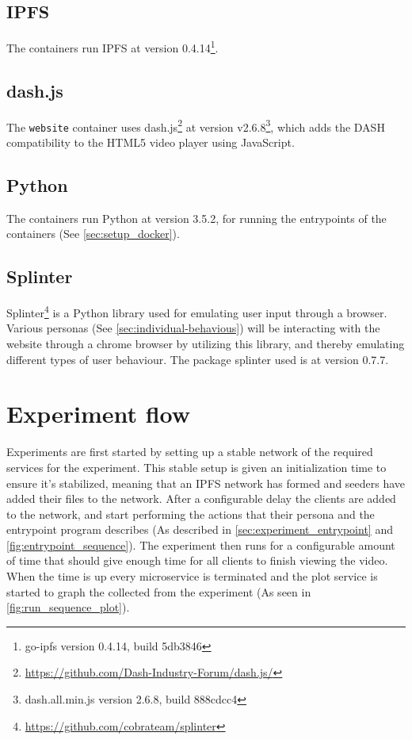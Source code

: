 \subsection{IPFS}
\label{sec:setup_ipfs}
The containers run \acs{IPFS} at version 0.4.14\footnote{go-ipfs version 0.4.14, build 5db3846}.


\subsection{dash.js}
\label{sec:setup_dash.js}
The \texttt{website} container uses dash.js\footnote{\url{https://github.com/Dash-Industry-Forum/dash.js/}} at version v2.6.8\footnote{dash.all.min.js version 2.6.8, build 888cdcc4}, which adds the \ac{DASH} compatibility to the \acs{HTML}5 video player using JavaScript.


\subsection{Python}
\label{sec:setup_python}
The containers run Python at version 3.5.2, for running the entrypoints of the containers (See \autoref{sec:setup_docker}).


\subsection{Splinter}
\label{sec:setup_splinter}
Splinter\footnote{\url{https://github.com/cobrateam/splinter}} is a Python library used for emulating user input through a browser. Various personas (See \autoref{sec:individual-behavious}) will be interacting with the website through a chrome browser by utilizing this library, and thereby emulating different types of user behaviour.
The package splinter used is at version 0.7.7.



\section{Experiment flow}
Experiments are first started by setting up a stable network of the required services for the experiment. This stable setup is given an initialization time to ensure it's stabilized, meaning that an IPFS network has formed and seeders have added their files to the network.
After a configurable delay the clients are added to the network, and start performing the actions that their persona and the entrypoint program describes (As described in \autoref{sec:experiment_entrypoint} and \autoref{fig:entrypoint_sequence}).
The experiment then runs for a configurable amount of time that should give enough time for all clients to finish viewing the video. When the time is up every microservice is terminated and the plot service is started to graph the collected from the experiment (As seen in \autoref{fig:run_sequence_plot}).

